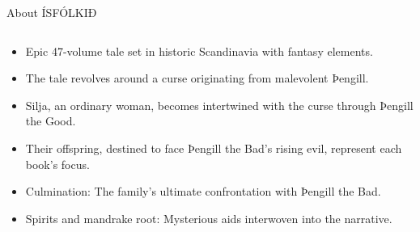 \begin{frame}{About ÍSFÓLKIÐ}

    \begin{columns}[T]
        \begin{column}{0.65\textwidth}
            \begin{itemize}
                \item Epic 47-volume tale set in historic Scandinavia with fantasy elements.
                \item The tale revolves around a curse originating from malevolent Þengill.
                \item Silja, an ordinary woman, becomes intertwined with the curse through Þengill the Good.
                \item Their offspring, destined to face Þengill the Bad's rising evil, represent each book's focus.
                \item Culmination: The family's ultimate confrontation with Þengill the Bad.
                \item Spirits and mandrake root: Mysterious aids interwoven into the narrative.
            \end{itemize}
        \end{column}


\end{columns}
\end{frame}
